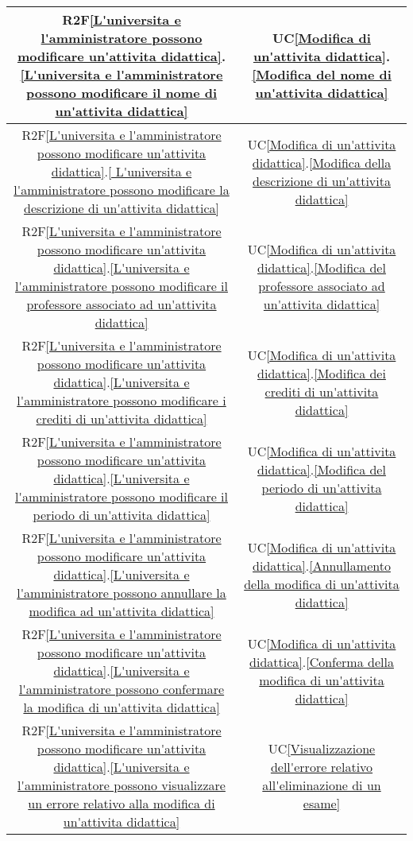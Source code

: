 \begin{longtable}{|c|c|}
\hline
R2F\ref{L'universita e l'amministratore possono modificare un'attivita didattica}.\ref{L'universita e l'amministratore possono modificare il nome di un'attivita didattica} & UC\ref{Modifica di un'attivita didattica}.\ref{Modifica del nome di un'attivita didattica}\\
\hline
R2F\ref{L'universita e l'amministratore possono modificare un'attivita didattica}.\ref{ L'universita e l'amministratore possono modificare la descrizione di un'attivita didattica} & UC\ref{Modifica di un'attivita didattica}.\ref{Modifica della descrizione di un'attivita didattica}\\
\hline
R2F\ref{L'universita e l'amministratore possono modificare un'attivita didattica}.\ref{L'universita e l'amministratore possono modificare il professore associato ad un'attivita didattica} & UC\ref{Modifica di un'attivita didattica}.\ref{Modifica del professore associato ad un'attivita didattica}\\
\hline
R2F\ref{L'universita e l'amministratore possono modificare un'attivita didattica}.\ref{L'universita e l'amministratore possono modificare i crediti di un'attivita didattica} & UC\ref{Modifica di un'attivita didattica}.\ref{Modifica dei crediti di un'attivita didattica}\\
\hline
R2F\ref{L'universita e l'amministratore possono modificare un'attivita didattica}.\ref{L'universita e l'amministratore possono modificare il periodo di un'attivita didattica} & UC\ref{Modifica di un'attivita didattica}.\ref{Modifica del periodo di un'attivita didattica}\\
\hline
R2F\ref{L'universita e l'amministratore possono modificare un'attivita didattica}.\ref{L'universita e l'amministratore possono annullare la modifica ad un'attivita didattica} & UC\ref{Modifica di un'attivita didattica}.\ref{Annullamento della modifica di un'attivita didattica}\\
\hline
R2F\ref{L'universita e l'amministratore possono modificare un'attivita didattica}.\ref{L'universita e l'amministratore possono confermare la modifica di un'attivita didattica} & UC\ref{Modifica di un'attivita didattica}.\ref{Conferma della modifica di un'attivita didattica}\\
\hline
R2F\ref{L'universita e l'amministratore possono modificare un'attivita didattica}.\ref{L'universita e l'amministratore possono visualizzare un errore relativo alla modifica di un'attivita didattica} & UC\ref{Visualizzazione dell'errore relativo all'eliminazione di un esame}\\

\end{longtable}

